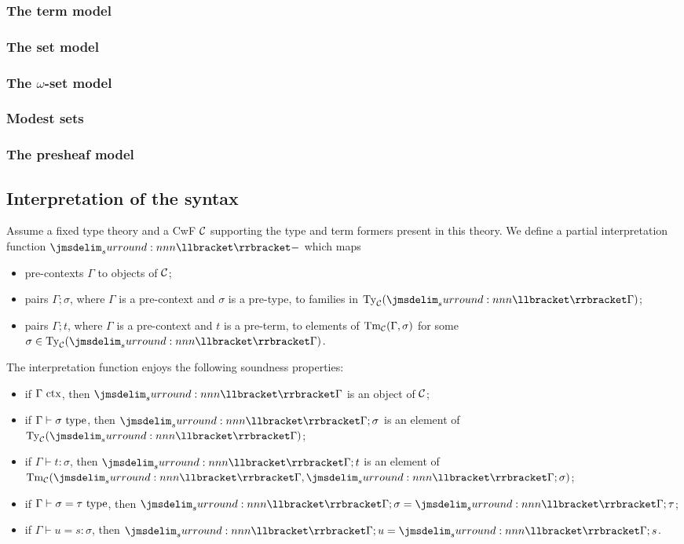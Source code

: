 \documentclass[a4paper]{article}
\begin{document}
\subsubsection{The term model}\label{sec:ttm}
\subsubsection{The set model}\label{sec:tsm}
\subsubsection{The $\omega$-set model}\label{sec:twsm}
\subsubsection{Modest sets}\label{sec:ms}
\subsubsection{The presheaf model}\label{sec:tpm}
\subsection{Interpretation of the syntax}\label{sec:iots}

Assume a fixed type theory and a CwF $\mathcal{C}$ supporting the type and term formers present in this theory.
We define a partial interpretation function $\intp{-}$ which maps
\begin{itemize}
\item pre-contexts $\Gamma$ to objects of $\mathcal{C}$;
\item pairs $\Gamma;\sigma$, where $\Gamma$ is a pre-context and $\sigma$ is a pre-type, to families in $\Ty{\cC}(\intp{\Gamma})$;
\item pairs $\Gamma;t$, where $\Gamma$ is a pre-context and $t$ is a pre-term, to elements of $\operatorname{Tm}_{\mathcal{C}}(\Gamma,\sigma)$ for some $\sigma \in \Ty{\cC}(\intp{\Gamma})$.
\end{itemize}

\begin{proposition}[Soundness]
  The interpretation function enjoys the following soundness properties:
  \begin{itemize}
  \item if $\Gamma~\mathrm{ctx}$, then $\intp{\Gamma}$ is an object of $\mathcal{C}$;
  \item if $\Gamma \vdash \sigma~\mathrm{type}$, then $\intp{\Gamma;\sigma}$ is an element of $\Ty{\cC}(\intp{\Gamma})$;
  \item if $\Gamma \vdash t : \sigma$, then $\intp{\Gamma;t}$ is an element of $\Tm{\cC}(\intp{\Gamma},\intp{\Gamma;\sigma})$;
  \item if $\Gamma \vdash \sigma = \tau~\mathrm{type}$, then $\intp{\Gamma;\sigma} = \intp{\Gamma;\tau}$;
  \item if $\Gamma \vdash u = s : \sigma$, then $\intp{\Gamma;u} = \intp{\Gamma;s}$.
  \end{itemize}
\end{proposition}
\end{document}
